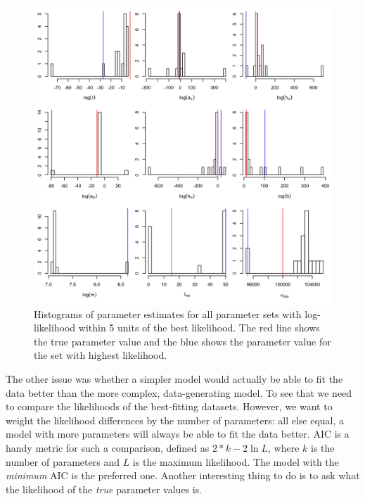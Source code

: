 \documentclass[12pt,reqno,final,pdftex]{amsart}\usepackage[]{graphicx}\usepackage[]{color}
\newenvironment{knitrout}{}{} %
\theoremstyle{plain}
\numberwithin{equation}{part}
\begin{document}
\begin{knitrout}\scriptsize
{}\color{fgcolor}\begin{figure}

\includegraphics[width=\linewidth]{figure/hist2-1} \hfill{}

\caption[Histograms of parameter estimates for all parameter sets with log-likelihood within 5 units of the best likelihood]{Histograms of parameter estimates for all parameter sets with log-likelihood within 5 units of the best likelihood. The red line shows the true parameter value and the blue shows the parameter value for the set with highest likelihood.}\label{fig:hist2}
\end{figure}


\end{knitrout}

The other issue was whether a simpler model would actually be able to fit the data better than the more complex, data-generating model.
To see that we need to compare the likelihoods of the best-fitting datasets.
However, we want to weight the likelihood differences by the number of parameters: all else equal, a model with more parameters will always be able to fit the data better.
AIC is a handy metric for such a comparison, defined as $2*k - 2\ln L$, where $k$ is the number of parameters and $L$ is the maximum likelihood.
The model with the \emph{minimum} AIC is the preferred one.
Another interesting thing to do is to ask what the likelihood of the \emph{true} parameter values is.
\end{document}
